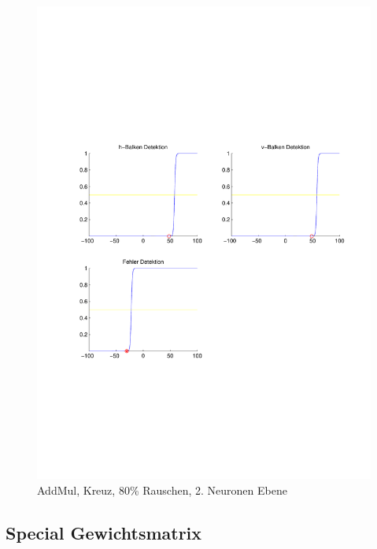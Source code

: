 \begin{figure}[hbt]
\begin{minipage}{0.8 \textwidth}
		\includegraphics[width=\textwidth]{./Bilder/Auswertung/Endergebnis/TypeAddMul_Rauschen80_Cross_Layer2}
		\caption{AddMul, Kreuz, 80\% Rauschen, 2. Neuronen Ebene}
		\label{AddMul_Kreuz_80_2}
	\end{minipage}
\end{figure}
\clearpage

\subsection{Special Gewichtsmatrix}
